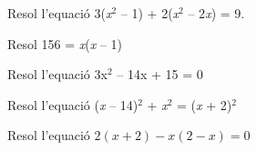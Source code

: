  
 
\begin{autoaval}{40}
	\begin{mylist}

\exer[2] Resol l'equació 3(\textit{x}${}^{2}$ -- 1) + 2(\textit{x}${}^{2}$ -- 2\textit{x}) = 9.

\exer[2] Resol 156 = \textit{x}(\textit{x} -- 1) 

\exer[2] Resol l'equació 3x${}^{ 2}$ -- 14x + 15 = 0  

\exer[2] Resol l'equació (\textit{x} -- 14)${}^{2}$ + \textit{x}${}^{2}$ = (\textit{x} + 2)${}^{2}$ 

\exer[2] Resol l'equació $2(x+2)-x(2-x)=0$ 

\end{mylist}
\end{autoaval}
